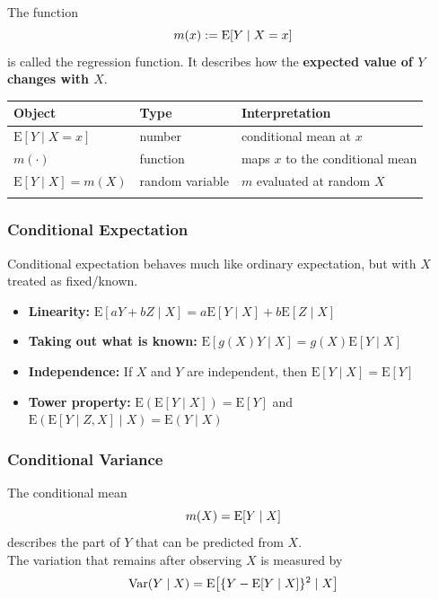 \begin{definition}\leavevmode \\
The function
\begin{equation}\label{eq:regfunc}
    m(x):= \operatorname{E} [Y \mid X = x]
\end{equation}
is called the regression function. It describes how the \textbf{expected value of $Y$ changes with $X$}.
\end{definition}

\begin{table}[H]
\centering
\begin{tabular}{@{}l p{3cm} l@{}}
\toprule
Object & Type & Interpretation\\
\midrule
$\text{E}[Y \mid X = x]$ & number & conditional mean at $x$\\
$m(\cdot)$ & function & maps $x$ to the conditional mean\\
$\text{E}[Y\mid X] = m(X)$ & random variable & $m$ evaluated at random $X$\\
\botrule
\end{tabular}
\end{table}

\subsubsection{Conditional Expectation}
Conditional expectation behaves much like ordinary expectation, but with $X$ treated as fixed/known.
\begin{itemize}
    \item \textbf{Linearity: } $\text{E}[aY + bZ \mid X]=a\text{E}[Y \mid X]+b\text{E}[Z \mid X]$
    \item \textbf{Taking out what is known: } $\text{E}[g(X)Y \mid X] = g(X)\text{E}[Y \mid X]$
    \item \textbf{Independence:} If $X$ and $Y$ are independent, then $\text{E}[Y \mid X] = \text{E}[Y]$
    \item \textbf{Tower property:} $\text{E}(\text{E}[Y \mid X])=\text{E}[Y]$ and $\text{E}(\text{E}[Y \mid Z, X] \mid X) =\text{E}(Y \mid X)$
\end{itemize}

\subsubsection{Conditional Variance}
The conditional mean
\begin{equation*}
    m(X)=\operatorname{E} [Y \mid X]
\end{equation*}
describes the part of $Y$ that can be predicted from $X$. \\
The variation that remains after observing $X$ is measured by
\begin{equation*}
    \operatorname{Var}(Y \mid X) = \operatorname{E} \bigl[ \{Y-\operatorname{E} [Y \mid X]\}^2 \mid X\bigr]
\end{equation*}

